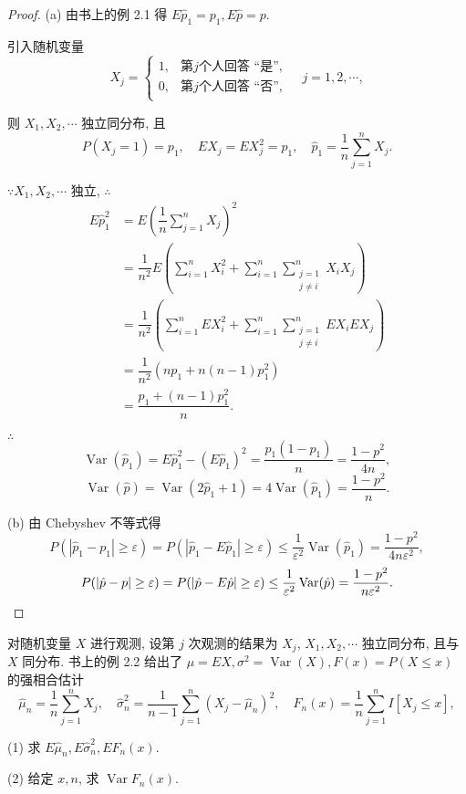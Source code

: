 \documentclass[color=black,device=normal,lang=cn]{elegantnote}
\numberwithin{equation}{section}
\theoremstyle{plain}
\numberwithin{exercise}{exsection}
\begin{document}
\begin{proof}
    (a) 由书上的例 2.1 得 $E\hat{p}_1=p_1,E\hat{p}=p$.

    引入随机变量
    \[X_j=\begin{cases}
        1, & \text{第}j\text{个人回答 ``是''}, \\
        0, & \text{第}j\text{个人回答 ``否''}, \\
    \end{cases}\quad j=1,2,\cdots,\]

    则 $X_1,X_2,\cdots$ 独立同分布, 且
    \[P(X_j=1)=p_1,\quad EX_j=EX_j^2=p_1,\quad\hat{p}_1=\dfrac{1}{n}\sum\limits_{j=1}^nX_j.\]

    $\because X_1,X_2,\cdots$ 独立, $\therefore$
    \begin{align*}
        E\hat{p}_1^2 & =E\left(\dfrac{1}{n}\sum\limits_{j=1}^nX_j\right)^2 \\
        & =\dfrac{1}{n^2}E\left(\sum\limits_{i=1}^nX_i^2+\sum\limits_{i=1}^n\sum\limits_{\substack{j=1\\j\neq i}}^nX_iX_j\right) \\
        & =\dfrac{1}{n^2}\left(\sum\limits_{i=1}^nEX_i^2+\sum\limits_{i=1}^n\sum\limits_{\substack{j=1\\j\neq i}}^nEX_iEX_j\right) \\
        & =\dfrac{1}{n^2}(np_1+n(n-1)p_1^2) \\
        & =\dfrac{p_1+(n-1)p_1^2}{n}.
    \end{align*}

    $\therefore$
    \[\operatorname{Var}(\hat{p}_1)=E\hat{p}_1^2-(E\hat{p}_1)^2=\dfrac{p_1(1-p_1)}{n}=\dfrac{1-p^2}{4n},\]
    \[\operatorname{Var}(\hat{p})=\operatorname{Var}(2\hat{p}_1+1)=4\operatorname{Var}(\hat{p}_1)=\dfrac{1-p^2}{n}.\]

    (b) 由 Chebyshev 不等式得
    \[P(|\hat{p}_1-p_1|\geq\varepsilon)=P(|\hat{p}_1-E\hat{p}_1|\geq\varepsilon)\leq\dfrac{1}{\varepsilon^2}\operatorname{Var}(\hat{p}_1)=\dfrac{1-p^2}{4n\varepsilon^2},\]
    \[P(|\hat{p}-p|\geq\varepsilon)=P(|\hat{p}-E\hat{p}|\geq\varepsilon)\leq\dfrac{1}{\varepsilon^2}\operatorname{Var}(\hat{p})=\dfrac{1-p^2}{n\varepsilon^2}.\qedhere\]
\end{proof}
\begin{exercise}[有修改]%
    对随机变量 $X$ 进行观测, 设第 $j$ 次观测的结果为 $X_j$, $X_1,X_2,\cdots$ 独立同分布, 且与 $X$ 同分布. 书上的例 2.2 给出了 $\mu=EX,\sigma^2=\operatorname{Var}(X),F(x)=P(X\leq x)$ 的强相合估计
    \[\hat{\mu}_n=\dfrac{1}{n}\sum\limits_{j=1}^nX_j,\quad\hat{\sigma}_n^2=\dfrac{1}{n-1}\sum\limits_{j=1}^n(X_j-\hat{\mu}_n)^2,\quad F_n(x)=\dfrac{1}{n}\sum\limits_{j=1}^nI[X_j\leq x],\]

    (1) 求 $E\hat{\mu}_n,E\hat{\sigma}_n^2,EF_n(x)$.

    (2) 给定 $x,n$, 求 $\operatorname{Var}F_n(x)$.
\end{exercise}
\end{document}
